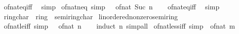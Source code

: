 \begin{isabellebody}
%
\isatagproof
{}\isamarkupfalse%
\ of{\isacharunderscore}{\kern0pt}nat{\isacharunderscore}{\kern0pt}eq{\isacharunderscore}{\kern0pt}{}{\isacharunderscore}{\kern0pt}iff\ \isamarkupfalse%
\ simp%
\endisatagproof
{\isafoldproof}%
%
\isadelimproof
\isanewline
%
\endisadelimproof
\isanewline
{}\isamarkupfalse%
\ of{\isacharunderscore}{\kern0pt}nat{\isacharunderscore}{\kern0pt}{}{\isacharunderscore}{\kern0pt}neq\ {\isacharbrackleft}{\kern0pt}simp{\isacharbrackright}{\kern0pt}{\isacharcolon}{\kern0pt}\ {\isachardoublequoteopen}{}\ {\isasymnoteq}\ of{\isacharunderscore}{\kern0pt}nat\ {\isacharparenleft}{\kern0pt}Suc\ n{\isacharparenright}{\kern0pt}{\isachardoublequoteclose}\isanewline
%
\isadelimproof
\ \ %
\endisadelimproof
%
\isatagproof
{}\isamarkupfalse%
\ of{\isacharunderscore}{\kern0pt}nat{\isacharunderscore}{\kern0pt}{}{\isacharunderscore}{\kern0pt}eq{\isacharunderscore}{\kern0pt}iff\ \isamarkupfalse%
\ simp%
\endisatagproof
{\isafoldproof}%
%
\isadelimproof
\isanewline
%
\endisadelimproof
\isanewline
{}\isamarkupfalse%
\isanewline
\isanewline
{}\isamarkupfalse%
\ ring{\isacharunderscore}{\kern0pt}char{\isacharunderscore}{\kern0pt}{}\ {\isacharequal}{\kern0pt}\ ring{\isacharunderscore}{\kern0pt}{}\ {\isacharplus}{\kern0pt}\ semiring{\isacharunderscore}{\kern0pt}char{\isacharunderscore}{\kern0pt}{}\isanewline
\isanewline
{}\isamarkupfalse%
\ linordered{\isacharunderscore}{\kern0pt}nonzero{\isacharunderscore}{\kern0pt}semiring\isanewline
{}\isanewline
\isanewline
{}\isamarkupfalse%
\ of{\isacharunderscore}{\kern0pt}nat{\isacharunderscore}{\kern0pt}{}{\isacharunderscore}{\kern0pt}le{\isacharunderscore}{\kern0pt}iff\ {\isacharbrackleft}{\kern0pt}simp{\isacharbrackright}{\kern0pt}{\isacharcolon}{\kern0pt}\ {\isachardoublequoteopen}{}\ {\isasymle}\ of{\isacharunderscore}{\kern0pt}nat\ n{\isachardoublequoteclose}\isanewline
%
\isadelimproof
\ \ %
\endisadelimproof
%
\isatagproof
{}\isamarkupfalse%
\ {\isacharparenleft}{\kern0pt}induct\ n{\isacharparenright}{\kern0pt}\ simp{\isacharunderscore}{\kern0pt}all%
\endisatagproof
{\isafoldproof}%
%
\isadelimproof
\isanewline
%
\endisadelimproof
\isanewline
{}\isamarkupfalse%
\ of{\isacharunderscore}{\kern0pt}nat{\isacharunderscore}{\kern0pt}less{\isacharunderscore}{\kern0pt}{}{\isacharunderscore}{\kern0pt}iff\ {\isacharbrackleft}{\kern0pt}simp{\isacharbrackright}{\kern0pt}{\isacharcolon}{\kern0pt}\ {\isachardoublequoteopen}{\isasymnot}\ of{\isacharunderscore}{\kern0pt}nat\ m\ {\isacharless}{\kern0pt}\ {}{\isachardoublequoteclose}\isanewline

\end{isabellebody}
